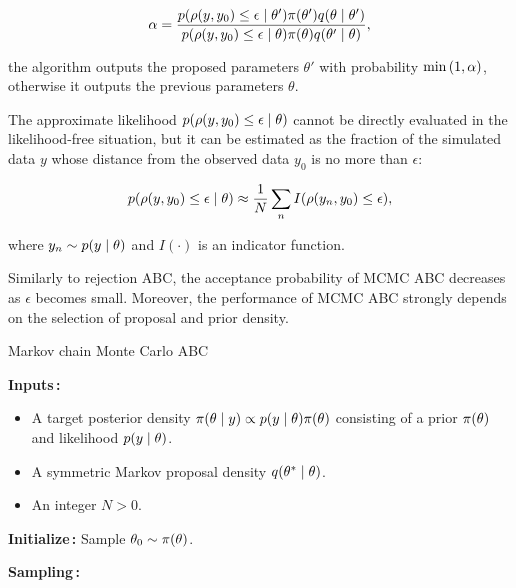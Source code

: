 \begin{equation}
    \alpha = \frac{p \qty(\rho \qty(y, y_0 ) \leq \epsilon \mid \theta') \pi\qty(\theta') q \qty(\theta \mid \theta')  }{p \qty(\rho \qty(y, y_0) \leq \epsilon \mid \theta) \pi\qty(\theta) q \qty(\theta' \mid \theta) },
\end{equation}

the algorithm outputs the proposed parameters $\theta'$ with probability $\min \qty(1, \alpha)$, otherwise it outputs the previous parameters $\theta$. 

The approximate likelihood $p \qty(\rho \qty(y, y_0 ) \leq \epsilon \mid \theta)$ cannot be directly evaluated in the likelihood-free situation, but it can be estimated as the fraction of the simulated data $y$ whose distance from the observed data $y_0$ is no more than $\epsilon$:

\begin{equation}
    p \qty(\rho \qty(y, y_0) \leq \epsilon \mid \theta) \approx \frac{1}{N} \sum_n I \qty(\rho \qty(y_n, y_0) \leq \epsilon),
\end{equation}

where $y_n \sim p \qty(y \mid \theta)$ and $I(\cdot)$ is an indicator function. %

Similarly to rejection ABC, the acceptance probability of MCMC ABC decreases as $\epsilon$ becomes small. Moreover, the performance of MCMC ABC strongly depends on the selection of proposal and prior density.

\begin{algorithm}[H]
\caption{Markov chain Monte Carlo ABC}
\label{alg:mcmcabc}
\SetAlgoLined
\DontPrintSemicolon
 \textbf{Inputs\,:}\;
 \vspace{-5mm}
 \begin{itemize}
     \item A target posterior density $\pi \qty(\theta \mid y) \propto p \qty(y \mid \theta) \pi \qty(\theta)$ consisting of a prior $\pi \qty(\theta)$ and likelihood $p \qty(y \mid \theta)$. 
     \item A symmetric Markov proposal density $q \qty(\theta^* \mid \theta)$.
     \item An integer $N>0$.
 \end{itemize}
 
 \vspace{5mm}
 \textbf{Initialize\,:}\;
 Sample $\theta_0 \sim \pi \qty(\theta)$.\;

 \vspace{5mm}
 \textbf{Sampling\,:}\;
\end{algorithm}

